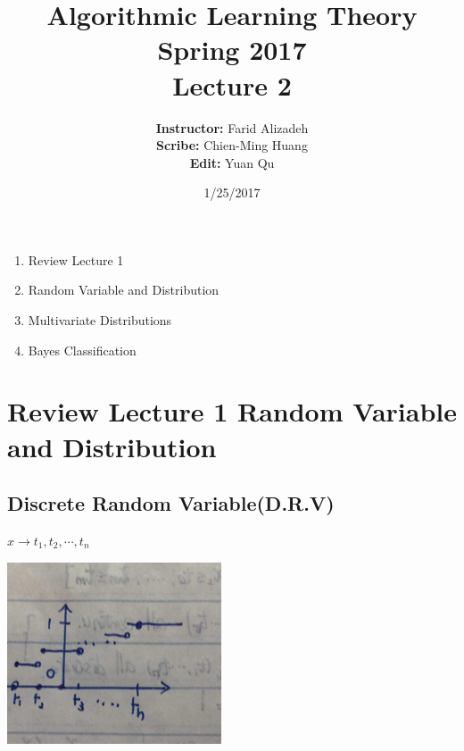 \documentclass{article}
\title{ 
Algorithmic Learning Theory\\
Spring 2017\\
Lecture 2 %
}
\author{
{\bf Instructor: } Farid Alizadeh\\
{\bf Scribe: } Chien-Ming Huang\\
{\bf Edit: } Yuan Qu\\
}
\date{1/25/2017} %
\begin{document}
\pagestyle{fancy}

\maketitle
%


\medskip
\begin{enumerate}
\item Review Lecture 1 
\item Random Variable and Distribution
\item Multivariate Distributions
\item Bayes Classification
\end{enumerate}

\section{Review Lecture 1 Random Variable and Distribution} 
\subsection{Discrete Random Variable(D.R.V)}
	$ x\rightarrow t_1, t_2, \cdots, t_n$
	
\begin{center}{
\includegraphics{discreterv.png}
}
\end{center}    
        
\end{document}
